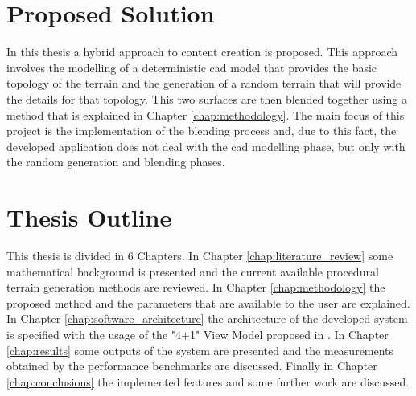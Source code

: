 \section{Proposed Solution}

In this thesis a hybrid approach to content creation is proposed. This approach involves the modelling of a deterministic cad model that provides the basic topology of the terrain and the generation of a random terrain that will provide the details for that topology. This two surfaces are then blended together using a method that is explained in Chapter \ref{chap:methodology}. The main focus of this project is the implementation of the blending process and, due to this fact, the developed application does not deal with the cad modelling phase, but only with the random generation and blending phases.


\section{Thesis Outline}

This thesis is divided in 6 Chapters. In Chapter \ref{chap:literature_review} some mathematical background is presented and the current available procedural terrain generation methods are reviewed. In Chapter \ref{chap:methodology} the proposed method and the parameters that are available to the user are explained. In Chapter \ref{chap:software_architecture} the architecture of the developed system is specified with the usage of the "4+1" View Model proposed in \cite{Kruchten1995}. In Chapter \ref{chap:results} some outputs of the system are presented and the measurements obtained by the performance benchmarks are discussed. Finally in Chapter \ref{chap:conclusions} the implemented features and some further work are discussed. 